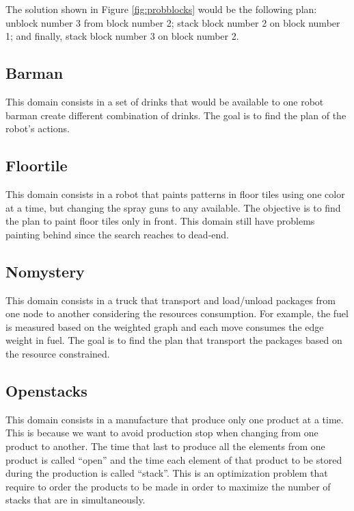 The solution shown in Figure \ref{fig:probblocks} would be the following plan: unblock number 3 from block number 2; stack block number 2 on block number 1; and finally, stack block number 3 on block number 2.

\subsection{Barman}
This domain consists in a set of drinks that would be available to one robot barman create different combination of drinks. The goal is to find the plan of the robot's actions.

\subsection{Floortile}
This domain consists in a robot that paints patterns in floor tiles using one color at a time, but changing the spray guns to any available. The objective is to find the plan to paint floor tiles only in front. This domain still have problems painting behind since the search reaches to dead-end.

\subsection{Nomystery}
This domain consists in a truck that transport and load/unload packages from one node to another considering the resources consumption. For example, the fuel is measured based on the weighted graph and each move consumes the edge weight in fuel. The goal is to find the plan that transport the packages based on the resource constrained.

\subsection{Openstacks}
This domain consists in a manufacture that produce only one product at a time. This is because we want to avoid production stop when changing from one product to another. The time that last to produce all the elements from one product is called ``open'' and the time each element of that product to be stored during the production is called ``stack''. This is an optimization problem that require to order the products to be made in order to maximize the number of stacks that are in simultaneously.


